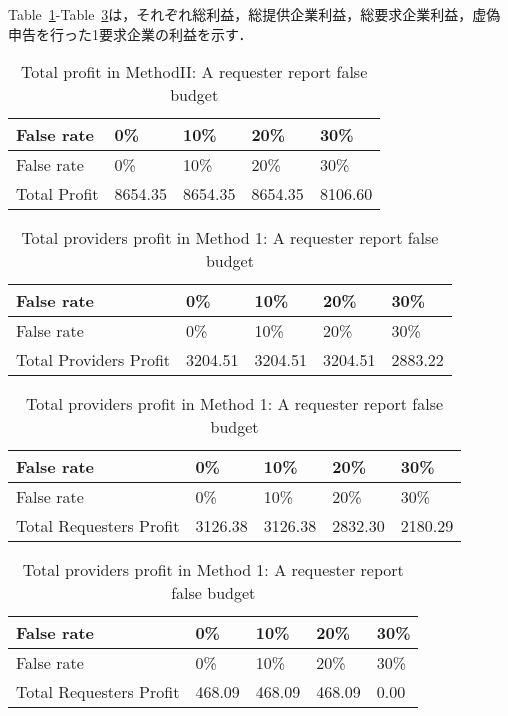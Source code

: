 Table~\ref{tbl:m2-3-total-profit}-Table~\ref{tbl:m2-3-requesters-total-profit}は，それぞれ総利益，総提供企業利益，総要求企業利益，虚偽申告を行った1要求企業の利益を示す．

\hypertarget{tbl:m2-3-total-profit}{}
\begin{longtable}[H]{@{}lllll@{}}
\caption{\label{tbl:m2-3-total-profit}Total profit in MethodII: A
requester report false budget}\tabularnewline
\toprule
False rate & 0\% & 10\% & 20\% & 30\%\tabularnewline
\midrule
\endfirsthead
\toprule
False rate & 0\% & 10\% & 20\% & 30\%\tabularnewline
\midrule
\endhead
Total Profit & 8654.35 & 8654.35 & 8654.35 & 8106.60\tabularnewline
\bottomrule
\end{longtable}

\hypertarget{tbl:m2ux20133providers-total-profit}{}
\begin{longtable}[H]{@{}lllll@{}}
\caption{\label{tbl:m2ux20133providers-total-profit}Total providers
profit in Method 1: A requester report false budget}\tabularnewline
\toprule
False rate & 0\% & 10\% & 20\% & 30\%\tabularnewline
\midrule
\endfirsthead
\toprule
False rate & 0\% & 10\% & 20\% & 30\%\tabularnewline
\midrule
\endhead
Total Providers Profit & 3204.51 & 3204.51 & 3204.51 &
2883.22\tabularnewline
\bottomrule
\end{longtable}

\hypertarget{tbl:m2-3-requesters-total-profit}{}
\begin{longtable}[H]{@{}lllll@{}}
\caption{\label{tbl:m2-3-requesters-total-profit}Total providers profit
in Method 1: A requester report false budget}\tabularnewline
\toprule
False rate & 0\% & 10\% & 20\% & 30\%\tabularnewline
\midrule
\endfirsthead
\toprule
False rate & 0\% & 10\% & 20\% & 30\%\tabularnewline
\midrule
\endhead
Total Requesters Profit & 3126.38 & 3126.38 & 2832.30 &
2180.29\tabularnewline
\bottomrule
\end{longtable}

\hypertarget{tbl:m2-3-false-requester-profit}{}
\begin{longtable}[H]{@{}lllll@{}}
\caption{\label{tbl:m2-3-false-requester-profit}Total providers profit
in Method 1: A requester report false budget}\tabularnewline
\toprule
False rate & 0\% & 10\% & 20\% & 30\%\tabularnewline
\midrule
\endfirsthead
\toprule
False rate & 0\% & 10\% & 20\% & 30\%\tabularnewline
\midrule
\endhead
Total Requesters Profit & 468.09 & 468.09 & 468.09 & 0.00\tabularnewline
\bottomrule
\end{longtable}

